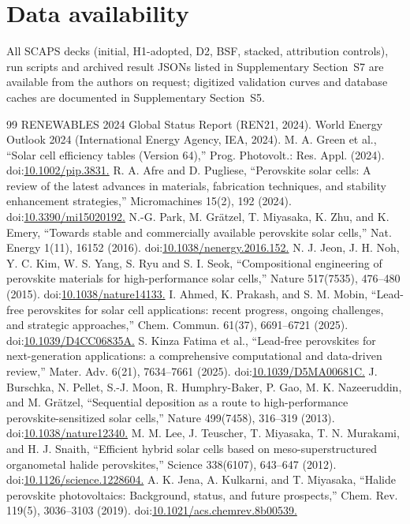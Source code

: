 \documentclass[review]{elsarticle}
\begin{document}
\section*{Data availability}
All SCAPS decks (initial, H1-adopted, D2, BSF, stacked, attribution controls), run scripts and archived result JSONs listed in Supplementary Section~S7 are available from the authors on request; digitized validation curves and database caches are documented in Supplementary Section~S5.

\begin{thebibliography}{99}
 RENEWABLES 2024 Global Status Report (REN21, 2024).
 World Energy Outlook 2024 (International Energy Agency, IEA, 2024).
 M. A. Green et al., ``Solar cell efficiency tables (Version 64),'' Prog. Photovolt.: Res. Appl. (2024). doi:\url{10.1002/pip.3831.}
 R. A. Afre and D. Pugliese, ``Perovskite solar cells: A review of the latest advances in materials, fabrication techniques, and stability enhancement strategies,'' Micromachines 15(2), 192 (2024). doi:\url{10.3390/mi15020192.}
 N.-G. Park, M. Grätzel, T. Miyasaka, K. Zhu, and K. Emery, ``Towards stable and commercially available perovskite solar cells,'' Nat. Energy 1(11), 16152 (2016). doi:\url{10.1038/nenergy.2016.152.}
 N. J. Jeon, J. H. Noh, Y. C. Kim, W. S. Yang, S. Ryu and S. I. Seok, ``Compositional engineering of perovskite materials for high-performance solar cells,'' Nature 517(7535), 476--480 (2015). doi:\url{10.1038/nature14133.}
 I. Ahmed, K. Prakash, and S. M. Mobin, ``Lead-free perovskites for solar cell applications: recent progress, ongoing challenges, and strategic approaches,'' Chem. Commun. 61(37), 6691--6721 (2025). doi:\url{10.1039/D4CC06835A.}
 S. Kinza Fatima et al., ``Lead-free perovskites for next-generation applications: a comprehensive computational and data-driven review,'' Mater. Adv. 6(21), 7634--7661 (2025). doi:\url{10.1039/D5MA00681C.}
 J. Burschka, N. Pellet, S.-J. Moon, R. Humphry-Baker, P. Gao, M. K. Nazeeruddin, and M. Grätzel, ``Sequential deposition as a route to high-performance perovskite-sensitized solar cells,'' Nature 499(7458), 316--319 (2013). doi:\url{10.1038/nature12340.}
 M. M. Lee, J. Teuscher, T. Miyasaka, T. N. Murakami, and H. J. Snaith, ``Efficient hybrid solar cells based on meso-superstructured organometal halide perovskites,'' Science 338(6107), 643--647 (2012). doi:\url{10.1126/science.1228604.}
 A. K. Jena, A. Kulkarni, and T. Miyasaka, ``Halide perovskite photovoltaics: Background, status, and future prospects,'' Chem. Rev. 119(5), 3036--3103 (2019). doi:\url{10.1021/acs.chemrev.8b00539.}

\end{thebibliography}
\end{document}
